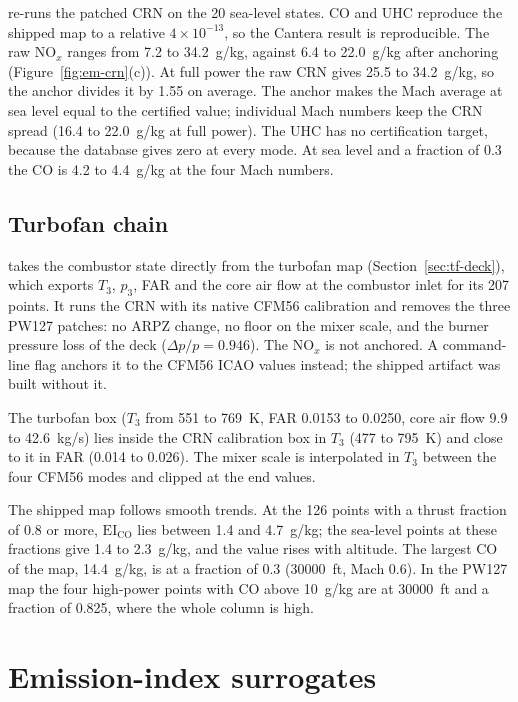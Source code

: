 \documentclass[a4paper,11pt]{article}
\newcommand{\EI}[1]{\mathrm{EI}_{\mathrm{#1}}}
\begin{document}
 re-runs the patched CRN on the 20 sea-level states. CO and UHC reproduce the
shipped map to a relative $4\times10^{-13}$, so the Cantera result is reproducible. The raw
NO$_x$ ranges from 7.2 to \SI{34.2}{g/kg}, against 6.4 to \SI{22.0}{g/kg} after anchoring
(Figure~\ref{fig:em-crn}(c)). At full power the raw CRN gives 25.5 to \SI{34.2}{g/kg}, so the
anchor divides it by 1.55 on average. The anchor makes the Mach average at sea level equal to
the certified value; individual Mach numbers keep the CRN spread (16.4 to \SI{22.0}{g/kg} at full
power). The UHC has no certification target, because the database gives zero at every mode.
At sea level and a fraction of 0.3 the CO is 4.2 to \SI{4.4}{g/kg} at the four Mach numbers.

\subsection{Turbofan chain}\label{sec:em-tf}
 takes the combustor state directly from the turbofan map
(Section~\ref{sec:tf-deck}), which exports $T_3$, $p_3$, FAR and the core air flow at the
combustor inlet for its 207 points. It runs the CRN with its native CFM56 calibration and
removes the three PW127 patches: no ARPZ change, no floor on the mixer scale, and the burner
pressure loss of the deck ($\Delta p/p = 0.946$). The NO$_x$ is not anchored. A command-line flag
 anchors it to the CFM56 ICAO values instead; the shipped artifact was built
without it.

The turbofan box ($T_3$ from 551 to \SI{769}{K}, FAR 0.0153 to 0.0250, core air flow 9.9 to
\SI{42.6}{kg/s}) lies inside the CRN calibration box in $T_3$ (477 to \SI{795}{K}) and close to it
in FAR (0.014 to 0.026). The mixer scale is interpolated in $T_3$ between the four CFM56 modes
and clipped at the end values.

The shipped map follows smooth trends. At the 126 points with a thrust fraction of 0.8 or more,
$\EI{CO}$ lies between 1.4 and \SI{4.7}{g/kg}; the sea-level points at these fractions give 1.4 to
\SI{2.3}{g/kg}, and the value rises with altitude. The largest CO of the map, \SI{14.4}{g/kg}, is
at a fraction of 0.3 (\SI{30000}{ft}, Mach 0.6). In the PW127 map the four high-power points with
CO above \SI{10}{g/kg} are at \SI{30000}{ft} and a fraction of 0.825, where the whole column is
high.

\section{Emission-index surrogates}\label{sec:em-surrogate}
\end{document}

